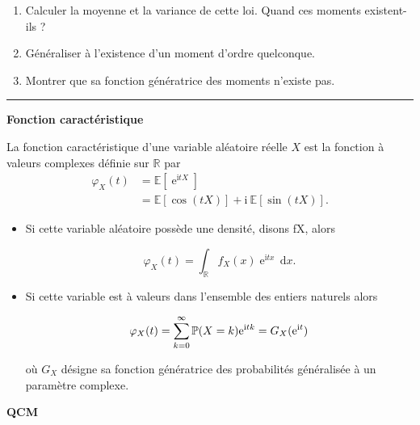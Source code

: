 \documentclass[../PolyS4.tex]{subfiles}
\begin{document}
\begin{enumerate}
\item Calculer la moyenne et la variance de cette loi. Quand ces moments existent-ils ? 
\item Généraliser à l'existence d'un moment d'ordre quelconque.
\item Montrer que sa fonction génératrice des moments n'existe pas.
\end{enumerate}

\vspace{1em}
\hrule
\vspace{1em}




\begin{Def}{\textbf{Fonction caractéristique}}



La fonction caractéristique d'une variable aléatoire réelle $X$ est la fonction à valeurs complexes définie sur $ \mathbb {R} $ par\\

$$\displaystyle {\begin{aligned}\varphi _{X}(t)&=\mathbb {E} \left[\operatorname {e} ^{\mathrm {i} tX}\right]\\&=\mathbb {E} \left[\cos(tX)\right]+\mathrm {i} \ \mathbb {E} \left[\sin(tX)\right].\end{aligned}}$$

\begin{itemize}
    \item Si cette variable aléatoire possède une densité, disons fX, alors

      $$\displaystyle \varphi _{X}(t)=\int _{\mathbb {R} }f_{X}(x)\operatorname {e} ^{\mathrm {i} tx}\,\mathrm {d} x.$$

  \item

    Si cette variable est à valeurs dans l'ensemble des entiers naturels alors

 $$\displaystyle \varphi _{X}(t)=\sum _{k=0}^{\infty }\mathbb {P} (X=k){\rm {e}}^{\mathrm {i} tk}=G_{X}({\rm {e}}^{\mathrm {i} t})$$

    où $G_X$ désigne sa fonction génératrice des probabilités généralisée à un paramètre complexe.
\end{itemize}
\end{Def}

\textbf*{QCM}
\end{document}
